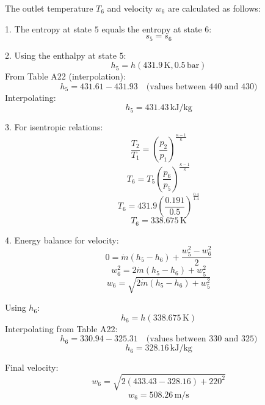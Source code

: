 The outlet temperature \( T_6 \) and velocity \( w_6 \) are calculated as follows:  

1. The entropy at state \( 5 \) equals the entropy at state \( 6 \):  
\[
s_5 = s_6
\]

2. Using the enthalpy at state \( 5 \):  
\[
h_5 = h(431.9 \, \text{K}, 0.5 \, \text{bar})  
\]
From Table A22 (interpolation):  
\[
h_5 = 431.61 - 431.93 \quad \text{(values between 440 and 430)}  
\]
Interpolating:  
\[
h_5 = 431.43 \, \text{kJ/kg}
\]

3. For isentropic relations:  
\[
\frac{T_2}{T_1} = \left( \frac{p_2}{p_1} \right)^{\frac{\kappa - 1}{\kappa}}  
\]
\[
T_6 = T_5 \left( \frac{p_6}{p_5} \right)^{\frac{\kappa - 1}{\kappa}}  
\]
\[
T_6 = 431.9 \left( \frac{0.191}{0.5} \right)^{\frac{0.4}{1.4}}  
\]
\[
T_6 = 338.675 \, \text{K}
\]

4. Energy balance for velocity:  
\[
0 = \dot{m}(h_5 - h_6) + \frac{w_5^2 - w_6^2}{2}  
\]
\[
w_6^2 = 2 \dot{m}(h_5 - h_6) + w_5^2  
\]
\[
w_6 = \sqrt{2 \dot{m}(h_5 - h_6) + w_5^2}  
\]

Using \( h_6 \):  
\[
h_6 = h(338.675 \, \text{K})  
\]
Interpolating from Table A22:  
\[
h_6 = 330.94 - 325.31 \quad \text{(values between 330 and 325)}  
\]
\[
h_6 = 328.16 \, \text{kJ/kg}
\]

Final velocity:  
\[
w_6 = \sqrt{2 (433.43 - 328.16) + 220^2}  
\]
\[
w_6 = 508.26 \, \text{m/s}
\]